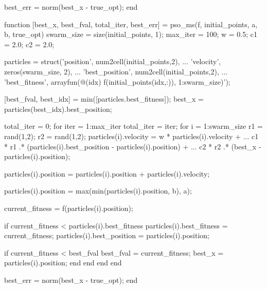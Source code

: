 \begin{matlab}
    best_err = norm(best_x - true_opt);
end

function [best_x, best_fval, total_iter, best_err] = pso_ms(f, initial_points, a, b, true_opt)
    swarm_size = size(initial_points, 1);
    max_iter = 100;       %
    w = 0.5;              %
    c1 = 2.0;             %
    c2 = 2.0;             %
    
    particles = struct('position', num2cell(initial_points,2), ...
                      'velocity', zeros(swarm_size, 2), ...
                      'best_position', num2cell(initial_points,2), ...
                      'best_fitness', arrayfun(@(idx) f(initial_points(idx,:)), 1:swarm_size)');
    
    [best_fval, best_idx] = min([particles.best_fitness]);
    best_x = particles(best_idx).best_position;
    
    total_iter = 0;
    for iter = 1:max_iter
        total_iter = iter;
        for i = 1:swarm_size
            r1 = rand(1,2);
            r2 = rand(1,2);
            particles(i).velocity = w * particles(i).velocity + ...
                c1 * r1 .* (particles(i).best_position - particles(i).position) + ...
                c2 * r2 .* (best_x - particles(i).position);
            
            particles(i).position = particles(i).position + particles(i).velocity;
            
            particles(i).position = max(min(particles(i).position, b), a);
            
            current_fitness = f(particles(i).position);
            
            if current_fitness < particles(i).best_fitness
                particles(i).best_fitness = current_fitness;
                particles(i).best_position = particles(i).position;
                
                if current_fitness < best_fval
                    best_fval = current_fitness;
                    best_x = particles(i).position;
                end
            end
        end
    end
    
    best_err = norm(best_x - true_opt);
end
\end{matlab}

